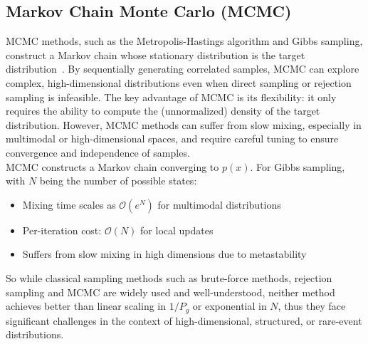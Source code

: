 \documentclass[encoding=utf8,british]{tumphthesis}
\begin{document}
        \subsection{Markov Chain Monte Carlo (MCMC)}
            MCMC methods, such as the Metropolis-Hastings algorithm and Gibbs sampling, construct a Markov chain whose stationary distribution 
            is the target distribution~\cite{PMC5862921}. By sequentially generating correlated samples, MCMC can explore complex, 
            high-dimensional distributions even when direct sampling or rejection sampling is infeasible. The key advantage of MCMC is its 
            flexibility: it only requires the ability to compute the (unnormalized) density of the target distribution. However, MCMC methods 
            can suffer from slow mixing, especially in multimodal or high-dimensional spaces, and require careful tuning to ensure convergence 
            and independence of samples.
            \\
            MCMC constructs a Markov chain converging to $p(x)$. For Gibbs sampling, with $N$ being the number of possible states:
            \begin{itemize}
                \item Mixing time scales as $\mathcal{O}(e^{N})$ for multimodal distributions
                \item Per-iteration cost: $\mathcal{O}(N)$ for local updates
                \item Suffers from slow mixing in high dimensions due to metastability
            \end{itemize}
            So while classical sampling methods such as brute-force methods, rejection sampling and MCMC are widely used and well-understood, neither method 
            achieves better than linear scaling in $1/P_g$ or exponential in $N$, thus they face significant challenges in the context 
            of high-dimensional, structured, or rare-event distributions.
\end{document}
